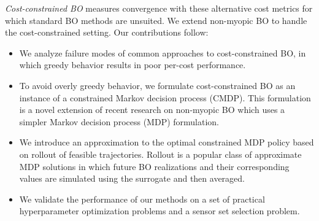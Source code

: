 \textit{Cost-constrained BO} measures convergence with these alternative cost metrics for which standard BO methods are unsuited. 
We extend non-myopic BO to handle the cost-constrained setting. Our contributions follow:
\begin{itemize}
    \item We analyze failure modes of common approaches to cost-constrained BO, in which greedy behavior results in poor per-cost performance.  
    \item To avoid overly greedy behavior, we formulate cost-constrained BO as an instance of a constrained Markov decision process (CMDP). This formulation is a novel extension of recent research on non-myopic BO which uses a simpler Markov decision process (MDP) formulation. 
    \item We introduce an approximation to the optimal constrained MDP policy based on rollout of feasible trajectories. Rollout is a popular class of approximate MDP solutions in which future BO realizations and their corresponding values are simulated using the surrogate and then averaged.
    \item We validate the performance of our methods on a set of practical hyperparameter optimization problems and a sensor set selection problem.
\end{itemize}
